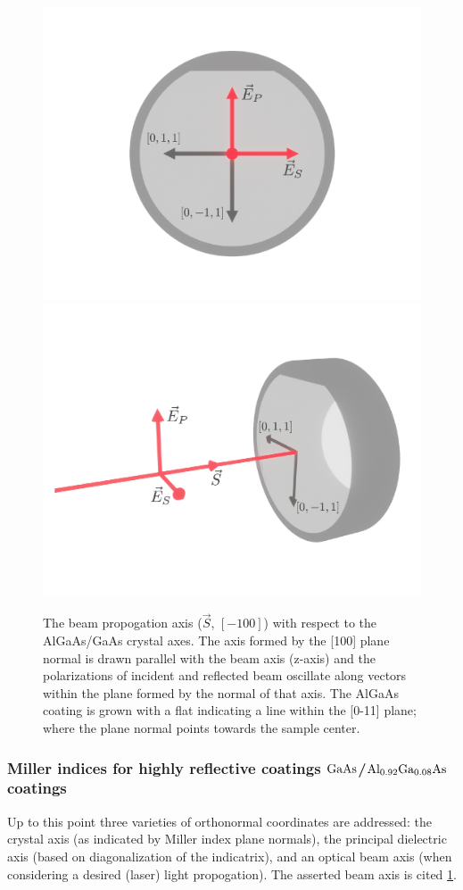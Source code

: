 \begin{figure}[!ht]
    \begin{subcaptiongroup}
	    \includegraphics[width=.5\textwidth]{figs/ALGAAS/coating_orientation_normal.pdf}
	    \label{co_normal}
	    \includegraphics[width=.5\textwidth]{figs/ALGAAS/coating_orientation_isometric.pdf}
	    \label{co_iso}
    \end{subcaptiongroup}
\caption{The beam propogation axis ($\vec{S}$, $[-100]$) with respect to the AlGaAs/GaAs crystal axes. The axis formed by the [100] plane normal is drawn parallel with the beam axis (z-axis) and the polarizations of incident and reflected beam oscillate along vectors within the plane formed by the normal of that axis. The AlGaAs coating is grown with a flat indicating a line within the [0-11] plane; where the plane normal points towards the sample center.}
\label{fig:algaas_coords}
\end{figure}

\subsubsection{Miller indices for highly reflective coatings $\mathrm{GaAs}$/$\mathrm{Al_{0.92}Ga_{0.08}As}$ coatings}
Up to this point three varieties of orthonormal coordinates are addressed: the crystal axis (as indicated by Miller index plane normals), the principal dielectric axis (based on diagonalization of the indicatrix), and an optical beam axis (when considering a desired (laser) light propogation). The asserted beam axis is cited \ref{fig:algaas_coords}.

